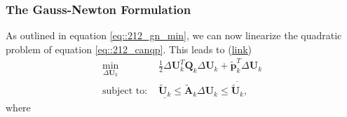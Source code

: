 \subsubsection{The Gauss-Newton Formulation}
\label{sec::212_gn}
As outlined in equation \ref{eq::212_gn_min}, we can now linearize the quadratic problem of equation \ref{eq::212_canqp}. This leads to (\href{https://github.com/mhubii/nmpc_pattern_generator/blob/dc1f5a9366cbbbf76f1b02cada642f6ac9a04c89/libs/pattern_generator/src/nmpc_generator.cpp#L377}{\underline{link}})
\begin{align}
	\min_{\Delta\bm{U}_k}&\frac{1}{2}\Delta\bm{U}_k^T\bm{Q}_k\Delta\bm{U}_k + \tilde{\bm{p}}_k^T\Delta\bm{U}_k 
	\label{eq::212_ocp}\\
	\text{subject to: }&\underline{\tilde{\bm{U}}_k} \leq \tilde{\bm{A}}_k\Delta\bm{U}_k\leq\overline{\tilde{\bm{U}}_k},
\end{align}
where
